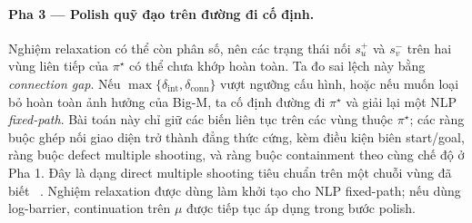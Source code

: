 \begin{appendices}
    \paragraph*{Pha 3 — Polish quỹ đạo trên đường đi cố định.}
    Nghiệm relaxation có thể còn phân số, nên các trạng thái nối $s_u^+$ và $s_v^-$
    trên hai vùng liên tiếp của $\pi^\star$ có thể chưa khớp hoàn toàn. Ta đo sai
    lệch này bằng \emph{connection gap}. Nếu
    $\max\{\delta_{\mathrm{int}},\delta_{\mathrm{conn}}\}$ vượt ngưỡng cấu hình,
    hoặc nếu muốn loại bỏ hoàn toàn ảnh hưởng của Big-M, ta cố định đường đi
    $\pi^\star$ và giải lại một NLP \emph{fixed-path}. Bài toán này chỉ giữ các biến
    liên tục trên các vùng thuộc $\pi^\star$; các ràng buộc ghép nối giao diện
    trở thành đẳng thức cứng, kèm điều kiện biên start/goal, ràng buộc defect
    multiple shooting, và ràng buộc containment theo cùng chế độ ở Pha 1. Đây là
    dạng direct multiple shooting tiêu chuẩn trên một chuỗi vùng đã biết
    ~\cite{BockPlitt1984, DiehlEtAl2006, Betts2010}. Nghiệm relaxation được dùng
    làm khởi tạo cho NLP fixed-path; nếu dùng log-barrier, continuation trên $\mu$
    được tiếp tục áp dụng trong bước polish.




\end{appendices}
